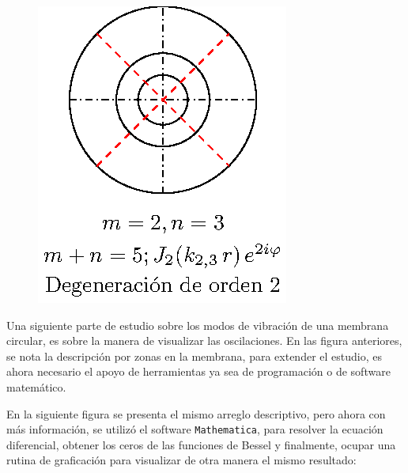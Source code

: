 \begin{minipage}{0.3\linewidth}
\begin{figure}[H]
    \centering
    \includegraphics[scale=1]{Imagenes/Modos_Vibracion_Membrana_2_3.eps}
\end{figure}
\end{minipage}

 Una siguiente parte de estudio sobre los modos de vibración de una membrana circular, es sobre la manera de visualizar las oscilaciones. En las figura anteriores, se nota la descripción por zonas en la membrana, para extender el estudio, es ahora necesario el apoyo de herramientas ya sea de programación o de software matemático.
\par
En la siguiente figura se presenta el mismo arreglo descriptivo, pero ahora con más información, se utilizó el software \texttt{Mathematica}, para resolver la ecuación diferencial, obtener los ceros de las funciones de Bessel y finalmente, ocupar una rutina de graficación para visualizar de otra manera el mismo resultado:


